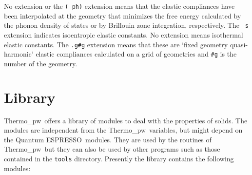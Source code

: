 \documentclass[12pt,a4paper,twoside]{report}
\def\qe{{\sc Quantum ESPRESSO}}
\def\tpw{{\sc Thermo\_pw}}
\begin{document}
No extension or the \texttt{(\_ph)} extension means that the elastic
compliances have been interpolated at the geometry that minimizes the
free energy calculated by the phonon density of states or by Brillouin
zone integration, respectively. 
The \texttt{\_s} extension indicates isoentropic elastic constants.
No extension means isothermal elastic constants.
The \texttt{.g\#g} extension means that these are `fixed geometry
quasi-harmonic' elastic compliances calculated on a grid of geometries
and \texttt{\#g} is the number of the geometry.

\newpage
{\color{dark-blue}\chapter{Library}}
\color{black}

\tpw\ offers a library of modules to deal with the properties of solids. The 
modules are independent from the \tpw\ variables, but might
depend on the \qe\ modules. They are used by the routines of \tpw\ 
but they can also be used by other programs such as those contained
in the \texttt{tools} directory. Presently the library contains the
following modules:
\end{document}
